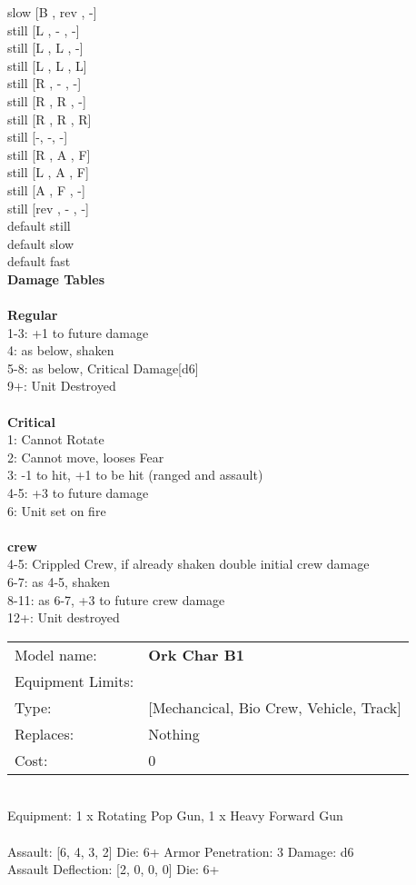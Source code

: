 slow [B ,  rev ,  -] \\
still [L ,  - ,  -] \\
still [L ,  L ,  -] \\
still [L ,  L ,  L] \\
still [R ,  - ,  -] \\
still [R ,  R ,  -] \\
still [R ,  R ,  R] \\
still [-, -, -] \\
still [R ,  A ,  F] \\
still [L ,  A ,  F] \\
still [A ,  F ,  -] \\
still [rev ,  - ,  -] \\
default still \\
default slow \\
default fast \\


{\bf Damage Tables} \\
\ \\ {\bf Regular } \\
1-3: +1 to future damage \\
4: as below, shaken \\
5-8: as below, Critical Damage[d6] \\
9+: Unit Destroyed \\
\ \\ {\bf Critical } \\
1: Cannot Rotate \\
2: Cannot move, looses Fear \\
3: -1 to hit, +1 to be hit (ranged and assault) \\
4-5: +3 to future damage \\
6: Unit set on fire \\
\ \\ {\bf crew } \\
4-5: Crippled Crew, if already shaken double initial crew damage \\
6-7: as 4-5, shaken \\
8-11: as 6-7, +3 to future crew damage \\
12+: Unit destroyed \\


\noindent
\begin{tabular}{ll}
Model name: &{\bf Ork Char B1 } \\
Equipment Limits: & \\
Type: &[Mechancical, Bio Crew, Vehicle, Track] \\
Replaces: &Nothing \\
Cost: & 0\\
\end{tabular}
\ \\
Equipment: 1 x Rotating Pop Gun, 1 x Heavy Forward Gun \\
\ \\
Assault: [6, 4, 3, 2] Die: 6+ Armor Penetration: 3 Damage: d6 \\
Assault Deflection: [2, 0, 0, 0] Die: 6+\\
\\ 
 
